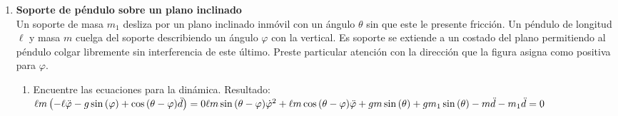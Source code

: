 \documentclass[11pt, a4paper, twoside]{article}
\begin{document}
\begin{enumerate}
\item
	\begin{minipage}[t][5.5cm]{0.7\textwidth}
		\textbf{Soporte de péndulo sobre un plano inclinado}\\
		Un soporte de masa \(m_1\) desliza por un plano inclinado inmóvil con un ángulo \(\theta\) sin que este le presente fricción.
		Un péndulo de longitud \(\ell\) y masa \(m\) cuelga del soporte describiendo un ángulo \(\varphi\) con la vertical.
		Es soporte se extiende a un costado del plano permitiendo al péndulo colgar libremente sin interferencia de este último.
		Preste particular atención con la dirección que la figura asigna como positiva para \(\varphi\).
		\begin{enumerate}
			\item Encuentre las ecuaciones para la dinámica. 
			Resultado:\\
			\(
				\ell m \left(- \ell \ddot{\varphi} - g \sin{\left(\varphi \right)} + \cos{\left(\theta - \varphi \right)} \ddot{d}\right) = 0
				\\[5 pt]
				\ell m \sin{\left(\theta - \varphi \right)} \dot{\varphi}^{2} + \ell m \cos{\left(\theta - \varphi \right)} \ddot{\varphi} + g m \sin{\left(\theta \right)} + g m_{1} \sin{\left(\theta \right)} - m \ddot{d} - m_{1} \ddot{d} = 0
			\)
		\end{enumerate}
	\end{minipage}
	\begin{minipage}[c][0cm][t]{0.3\textwidth}
		
	\end{minipage}
	



\end{enumerate}
\end{document}
